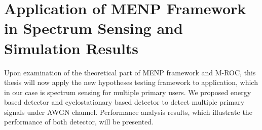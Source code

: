 \chapter{Application of MENP Framework in Spectrum Sensing and Simulation Results}
Upon examination of the theoretical part of MENP framework and M-ROC, this thesis will now apply the new hypotheses testing framework to application, which in our case is spectrum sensing for multiple primary users. We proposed energy based detector and cyclostationary based detector to detect multiple primary signals under AWGN channel. Performance analysis results, which illustrate the performance of both detector, will be presented. 

\typeout{}




\typeout{}

